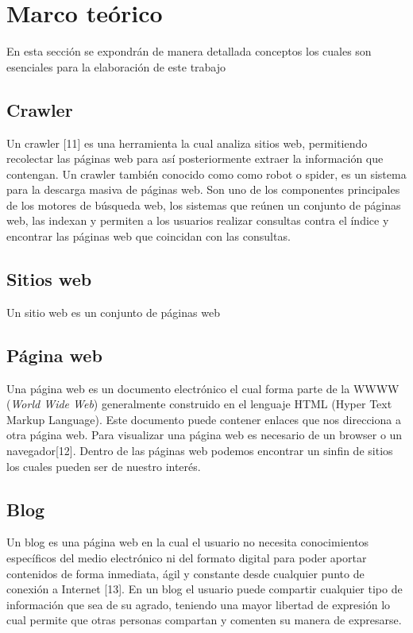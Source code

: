 
\chapter{Marco teórico}

En esta sección se expondrán de manera detallada conceptos los cuales son esenciales para la elaboración de este trabajo


\section{Crawler}
Un crawler [11] es una herramienta la cual analiza sitios web, permitiendo recolectar las páginas web para así posteriormente extraer la información que contengan. Un crawler también conocido como como robot o spider, es un sistema para la descarga masiva de páginas web. Son uno de los componentes principales de los motores de búsqueda web, los sistemas que reúnen un conjunto de páginas web, las indexan y permiten a los usuarios realizar consultas contra el índice y encontrar las páginas web que coincidan con las consultas.


\section{Sitios web}
Un sitio web es un conjunto de páginas web

\section{Página web}
Una página web es un documento electrónico el cual forma parte de la WWWW (\textit{World Wide Web}) generalmente construido en el lenguaje HTML (Hyper Text Markup Language). Este documento puede contener enlaces que nos direcciona a otra página web. Para visualizar una página web es necesario de un browser o un navegador[12]. Dentro de las páginas web podemos encontrar un sinfin de sitios los cuales pueden ser de nuestro interés.

\section{Blog}
Un blog es una página web en la cual el usuario no necesita conocimientos específicos del medio electrónico ni del formato digital para poder aportar contenidos de forma inmediata, ágil y constante desde cualquier punto de conexión a Internet [13]. En un blog el usuario puede compartir cualquier tipo de información que sea de su agrado, teniendo una mayor libertad de expresión lo cual permite que otras personas compartan y comenten su manera de expresarse.


